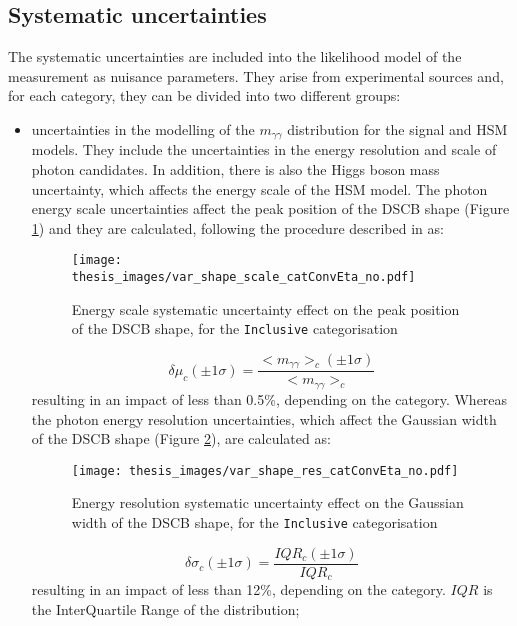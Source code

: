 \documentclass[a4paper, oneside, 11pt, openright]{book}
\begin{document}
 			
 			
 			\subsection{Systematic uncertainties}\label{section:syst}
 				The systematic uncertainties are included into the likelihood model of the measurement as nuisance parameters. They arise from experimental sources and, for each category, they can be divided into two different groups: 
 				\begin{itemize}
 					\item uncertainties in the modelling of the $m_{\gamma\gamma}$ distribution for the signal and HSM models. They include the uncertainties in the energy resolution and scale of photon candidates. In addition, there is also the Higgs boson mass uncertainty, which affects the energy scale of the HSM model. The photon energy scale uncertainties affect the peak position of the DSCB shape (Figure \ref{fig:scale_syst}) and they are calculated, following the procedure described in \cite{Aad_2019} as:
 					\begin{figure}
 						\centering
 						\texttt{[image: thesis\_images/var\_shape\_scale\_catConvEta\_no.pdf]}
 						\caption{Energy scale systematic uncertainty effect on the peak position of the DSCB shape, for the \texttt{Inclusive} categorisation}
 						\label{fig:scale_syst}
 					\end{figure}
 					\begin{equation}\label{eq:shape_syst}
 						\delta\mu_c(\pm1\sigma)=\frac{<m_{\gamma\gamma}>_c(\pm1\sigma)}{<m_{\gamma\gamma}>_c}
 					\end{equation}
 					resulting in an impact of less than 0.5\%, depending on the category. Whereas the photon energy resolution uncertainties, which affect the Gaussian width of the DSCB shape (Figure \ref{fig:res_syst}), are calculated \cite{Aad_2019} as:
 					\begin{figure}
 						\centering
 						\texttt{[image: thesis\_images/var\_shape\_res\_catConvEta\_no.pdf]}
 						\caption{Energy resolution systematic uncertainty effect on the Gaussian width of the DSCB shape, for the \texttt{Inclusive} categorisation}
 						\label{fig:res_syst}
 					\end{figure}
 					\begin{equation}\label{eq:res_syst}
 						\delta\sigma_c(\pm1\sigma)=\frac{IQR_c(\pm1\sigma)}{IQR_c}
 					\end{equation}
 					resulting in an impact of less than 12\%, depending on the category. $IQR$ is the InterQuartile Range of the distribution;

\end{itemize}
\end{document}
